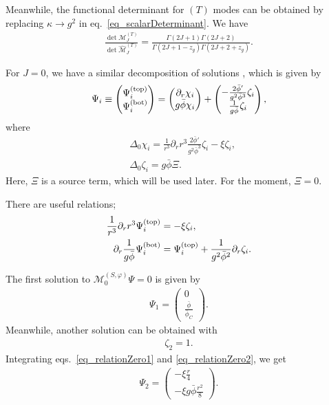 \documentclass[12pt]{article}
\begin{document}
Meanwhile, the functional determinant for $(T)$ modes can be obtained by
replacing $\kappa\to g^2$ in eq.~\eqref{eq_scalarDeterminant}. We have
\begin{align}
 \frac{\det\mathcal M_J^{(T)}}{\det\widehat{\mathcal M}_J^{(T)}}
 = \frac{\Gamma(2J+1)\Gamma(2J+2)}{\Gamma(2J+1-z_g)\Gamma(2J+2+z_g)}.
\end{align}

For $J = 0$, we have a similar decomposition of solutions
\cite{Endo:2017gal,Endo:2017tsz}, which is given by
\begin{align}
 \Psi_i\equiv
 \begin{pmatrix}
  \Psi_i^{\rm (top)} \\
  \Psi_i^{\rm (bot)}
 \end{pmatrix} =
 \begin{pmatrix}
  \partial_r\chi_i \\
  g\bar\phi\chi_i
 \end{pmatrix}
 +
 \begin{pmatrix}
  -\frac{2\bar\phi'}{g^2\bar\phi^3}\zeta_i \\
  \frac{1}{g\bar\phi}\zeta_i
 \end{pmatrix},
\end{align}
where
\begin{align}
  & \Delta_0\chi_i =
 \frac{1}{r^3}\partial_rr^3\frac{2\bar\phi'}{g^2\bar\phi^3}\zeta_i-\xi\zeta_i, \\
  & \Delta_0\zeta_i =
 g\bar\phi \Xi.
 \label{eq_gauge0zeta}
\end{align}
Here, $\Xi$ is a source term, which will be used later. For the moment,
$\Xi = 0$.

There are useful relations;
\begin{align}
 \frac{1}{r^3}\partial_rr^3\Psi_i^{\rm (top)}
  & = -\xi\zeta_i,
 \label{eq_relationZero1}                                            \\
 \partial_r\frac{1}{g\bar\phi}\Psi_i^{\rm (bot)}
  & = \Psi_i^{\rm (top)}+\frac{1}{g^2\bar\phi^2}\partial_r\zeta_i.
 \label{eq_relationZero2}
\end{align}

The first solution to $\mathcal M_0^{(S,\varphi)}\Psi = 0$ is given by
\begin{align}
 \Psi_1 =
 \begin{pmatrix}
  0 \\
  \frac{\bar\phi}{\bar\phi_C}
 \end{pmatrix}.
 \label{eq_gauge0psi1}
\end{align}
Meanwhile, another solution can be obtained with
\begin{align}
 \zeta_2 = 1.
\end{align}
Integrating eqs.~\eqref{eq_relationZero1} and \eqref{eq_relationZero2},
we get
\begin{align}
 \Psi_2 =
 \begin{pmatrix}
  -\xi\frac{r}{4} \\
  -\xi g\bar\phi\frac{r^2}{8}
 \end{pmatrix}.
\end{align}
\end{document}

